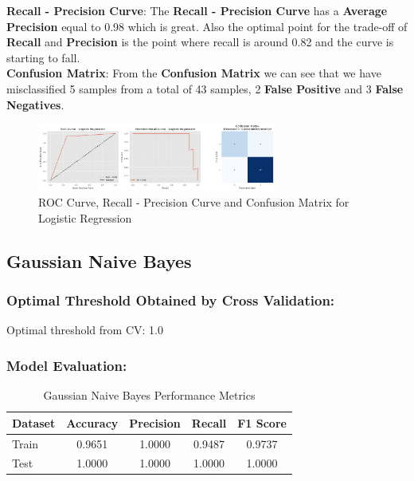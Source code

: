 \documentclass[a4paper,12pt]{article}
\begin{document}
\noindent\textbf{Recall - Precision Curve}:
The \textbf{Recall - Precision Curve} has a \textbf{Average Precision} equal to 0.98 which is great. Also the optimal point for the trade-off of \textbf{Recall} and \textbf{Precision}
is the point where recall is around 0.82 and the curve is starting to fall. \\ 

\noindent\textbf{Confusion Matrix}:
From the \textbf{Confusion Matrix} we can see that we have misclassified 5 samples from a total of 43 samples, 2 \textbf{False Positive} and 3 \textbf{False Negatives}. \\

\begin{figure}[H]
    \centering
    \includegraphics[width=0.7\textwidth]{./images/roc_rpc_cm_lr.png}
    \caption{ROC Curve, Recall - Precision Curve and Confusion Matrix for Logistic Regression}
    \label{fig:fig_3}
\end{figure}

\subsection{Gaussian Naive Bayes}
\subsubsection{Optimal Threshold Obtained by Cross Validation:}
Optimal threshold from CV: 1.0

\subsubsection{Model Evaluation:}

\begin{table}[H]
\centering
\caption{Gaussian Naive Bayes Performance Metrics}
\begin{tabular}{lcccc}
\toprule
\textbf{Dataset} & \textbf{Accuracy} & \textbf{Precision} & \textbf{Recall} & \textbf{F1 Score} \\
\midrule
Train & 0.9651 & 1.0000 & 0.9487 & 0.9737 \\
Test  & 1.0000 & 1.0000 & 1.0000 & 1.0000 \\
\bottomrule
\end{tabular}
\end{table}
\end{document}
